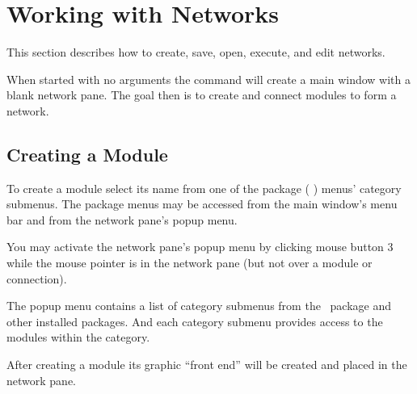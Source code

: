 %

  \newcommand{\modgraphic}%
  {\centerline{\epsfig{file=figures/modgraphic-1.eps.gz,width=4in,
        bbllx=18, bblly=18, bburx=594, bbury=355}}}
\begin{htmlonly}
  \newcommand{\modgraphic}{%
  \htmladdimg[align=top,width="350",alt="SCIRun Module Graphic"]
  {../figures/modgraphic-1.gif}}
\end{htmlonly}

  \newcommand{\moddialog}%
  {\centerline{\epsfig{file=figures/moddialog.eps.gz,width=3in,
        bbllx=18, bblly=18, bburx=557, bbury=774}}}
\begin{htmlonly}
  \newcommand{\moddialog}{%
  \htmladdimg[align=top,width="250",alt="SCIRun Module Dialog"]
  {../figures/moddialog.gif}}
\end{htmlonly}

\section{Working with Networks}
\label{sec:workwithnets}

This section describes how to create, save, open, execute, and edit
networks.

When started with no arguments the  command will create a
main window with a blank network pane.  The goal then is to create and
connect modules to form a network.


\subsection{Creating a Module}
\label{sec:creatingmodules}

To create a module select its name from one of the package (\eg{} \sr)
menus' category submenus.  The package menus may be accessed from the main
window's menu bar and from the network pane's popup menu.

You may activate the network pane's popup menu by clicking mouse button 3
while the mouse pointer is in the network pane (but not over a module or
connection).  

The popup menu contains a list of category submenus from the \sr\ package
and other installed packages.  And each category submenu provides
access to the modules within the category.

After creating a module its graphic ``front end'' will be created and
placed in the network pane.

